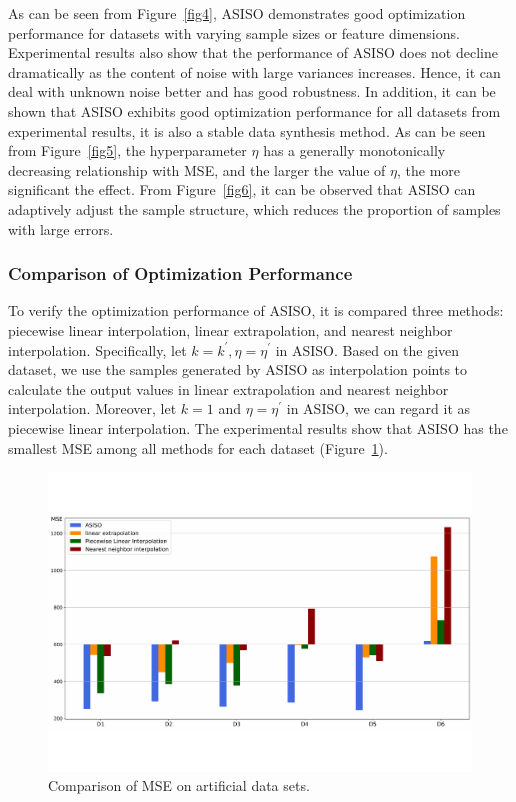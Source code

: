 \documentclass[sn-mathphys,Numbered]{sn-jnl}%
\theoremstyle{thmstyleone}%
\theoremstyle{thmstyletwo}%
\theoremstyle{thmstylethree}%
\begin{document}
As can be seen from Figure~\ref{fig4}, ASISO demonstrates good optimization performance for datasets with varying sample sizes or feature dimensions. Experimental results also show that the performance of ASISO does not decline dramatically as the content of noise with large variances increases. Hence, it can deal with unknown noise better and has good robustness. In addition, it can be shown that ASISO exhibits good optimization performance for all datasets from experimental results, it is also a stable data synthesis method. As can be seen from Figure~\ref{fig5}, the hyperparameter $\eta$ has a generally monotonically decreasing relationship with MSE, and the larger the value of $\eta$, the more significant the effect. From Figure~\ref{fig6}, it can be observed that ASISO can adaptively adjust the sample structure, which reduces the proportion of samples with large errors.

\subsubsection{Comparison of Optimization Performance}\label{subsubsec2}

To verify the optimization performance of ASISO, it is compared three methods: piecewise linear interpolation, linear extrapolation, and nearest neighbor interpolation. Specifically, let $k=k^\prime,\eta=\eta^\prime$ in ASISO. Based on the given dataset, we use the samples generated by ASISO as interpolation points to calculate the output values in linear extrapolation and nearest neighbor interpolation. Moreover, let $k=1$ and $\eta=\eta^\prime$ in ASISO, we can regard it as piecewise linear interpolation. The experimental results show that ASISO has the smallest MSE among all methods for each dataset (Figure~\ref{fig7}). 

\begin{figure}[H]%
\centering
\vspace{-1.0cm}   %
\setlength{\abovecaptionskip}{0.cm} %
\setlength{\abovecaptionskip}{-1.4cm} %
\includegraphics[width=1\textwidth]{fig7.pdf}
\caption{Comparison of MSE on artificial data sets.}\label{fig7}
\end{figure}
\end{document}
